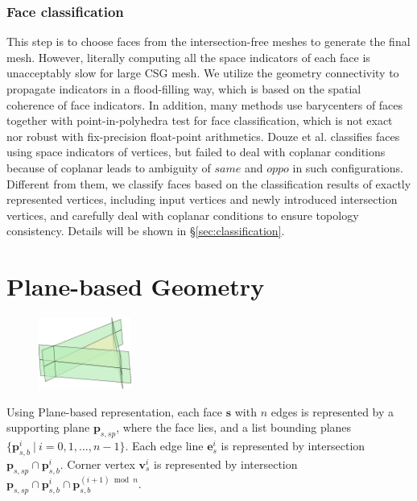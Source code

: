 \documentclass[10pt,journal,compsoc]{IEEEtran}
\begin{document}
\subsubsection{Face classification}

This step is to choose faces from the intersection-free meshes to generate the final mesh. However, literally computing all the space indicators of each face is unacceptably slow for large CSG mesh. We utilize the geometry connectivity to propagate indicators in a flood-filling way, which is based on the spatial coherence of face indicators. In addition, many methods use barycenters of faces together with point-in-polyhedra test for face classification, which is not exact nor robust with fix-precision float-point arithmetics. Douze et al. \cite{douze2015quickcsg} classifies faces using space indicators of vertices, but failed to deal with coplanar conditions because of coplanar leads to ambiguity of $same$ and $oppo$ in such configurations. Different from them, we classify faces based on the classification results of exactly represented vertices, including input vertices and newly introduced intersection vertices, and carefully deal with coplanar conditions to ensure topology consistency. Details will be shown in \S\ref{sec:classification}.


\section{Plane-based Geometry}



\begin{figure}
\includegraphics[width=1.2in]{p-reps}
\end{figure}

Using Plane-based representation, each face $\bm{s}$ with $n$ edges is represented by a supporting plane $\bm{p}_{s,sp}$, where the face lies, and a list bounding planes $\{\bm{p}_{s,b}^i \ \vert\  i = 0, 1,...,n-1\}$. Each edge line $\bm{e}_s^i$ is represented by intersection $\bm{p}_{s,sp} \cap \bm{p}_{s,b}^i$. Corner vertex $\bm{v}_s^i$ is represented by intersection $\bm{p}_{s,sp} \cap \bm{p}_{s,b}^i \cap \bm{p}_{s,b}^{{(i+1)}\bmod{n}}$.
\end{document}
